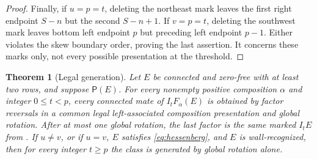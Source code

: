 \documentclass[11pt,a4paper]{amsart}
\numberwithin{equation}{section}
\theoremstyle{plain}
\newtheorem{theorem}{Theorem}[section]
\theoremstyle{definition}
\begin{document}
\begin{proof}
Finally, if \(u=p=t\), deleting the northeast mark leaves the first right endpoint \(S-n\) but the second \(S-n+1\).  If \(v=p=t\), deleting the southwest mark leaves bottom left endpoint \(p\) but preceding left endpoint \(p-1\).  Either violates the skew boundary order, proving the last assertion.  It concerns these marks only, not every possible presentation at the threshold.
\end{proof}

\begin{theorem}[Legal generation]\label{thm:legal-generation}
Let \(E\) be connected and zero-free with at least two rows, and suppose \(\mathsf P(E)\).  For every nonempty positive composition \(\alpha\) and integer \(0\le t<p\), every connected mate of \(I_tF_\alpha(E)\) is obtained by factor reversals in a common legal left-associated composition presentation and global rotation.  After at most one global rotation, the last factor is the same marked \(I_tE\) from .  If \(u\ne v\), or if \(u=v\), \(E\) satisfies \eqref{eq:hessenberg}, and \(E\) is wall-recognized, then for every integer \(t\ge p\) the class is generated by global rotation alone.
\end{theorem}
\end{document}
